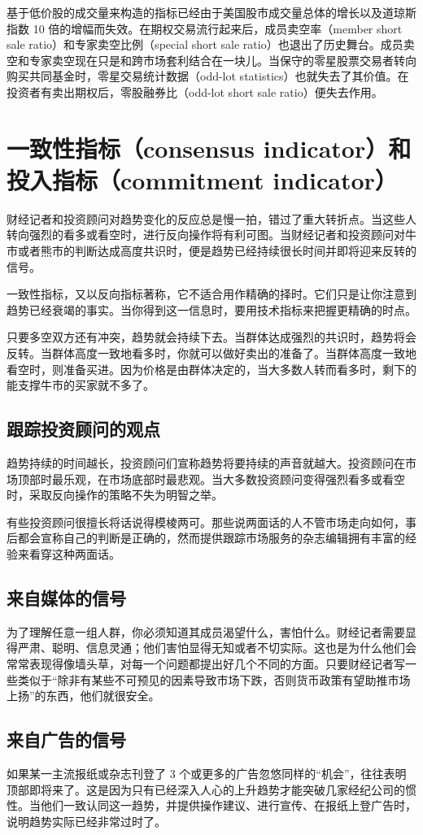 基于低价股的成交量来构造的指标已经由于美国股市成交量总体的增长以及道琼斯指数 10 倍的增幅而失效。在期权交易流行起来后，成员卖空率（member short sale ratio）和专家卖空比例（special short sale ratio）也退出了历史舞台。成员卖空和专家卖空现在只是和跨市场套利结合在一块儿。当保守的零星股票交易者转向购买共同基金时，零星交易统计数据（odd-lot statistics）也就失去了其价值。在投资者有卖出期权后，零股融券比（odd-lot short sale ratio）便失去作用。
\section{一致性指标（consensus indicator）和投入指标（commitment indicator）}
财经记者和投资顾问对趋势变化的反应总是慢一拍，错过了重大转折点。当这些人转向强烈的看多或看空时，进行反向操作将有利可图。当财经记者和投资顾问对牛市或者熊市的判断达成高度共识时，便是趋势已经持续很长时间并即将迎来反转的信号。

一致性指标，又以反向指标著称，它不适合用作精确的择时。它们只是让你注意到趋势已经衰竭的事实。当你得到这一信息时，要用技术指标来把握更精确的时点。

只要多空双方还有冲突，趋势就会持续下去。当群体达成强烈的共识时，趋势将会反转。当群体高度一致地看多时，你就可以做好卖出的准备了。当群体高度一致地看空时，则准备买进。因为价格是由群体决定的，当大多数人转而看多时，剩下的能支撑牛市的买家就不多了。
\subsection*{跟踪投资顾问的观点}
趋势持续的时间越长，投资顾问们宣称趋势将要持续的声音就越大。投资顾问在市场顶部时最乐观，在市场底部时最悲观。当大多数投资顾问变得强烈看多或看空时，采取反向操作的策略不失为明智之举。

有些投资顾问很擅长将话说得模棱两可。那些说两面话的人不管市场走向如何，事后都会宣称自己的判断是正确的，然而提供跟踪市场服务的杂志编辑拥有丰富的经验来看穿这种两面话。
\subsection*{来自媒体的信号}
为了理解任意一组人群，你必须知道其成员渴望什么，害怕什么。财经记者需要显得严肃、聪明、信息灵通；他们害怕显得无知或者不切实际。这也是为什么他们会常常表现得像墙头草，对每一个问题都提出好几个不同的方面。只要财经记者写一些类似于“除非有某些不可预见的因素导致市场下跌，否则货币政策有望助推市场上扬”的东西，他们就很安全。
\subsection*{来自广告的信号}
如果某一主流报纸或杂志刊登了 3 个或更多的广告忽悠同样的“机会”，往往表明顶部即将来了。这是因为只有已经深入人心的上升趋势才能突破几家经纪公司的惯性。当他们一致认同这一趋势，并提供操作建议、进行宣传、在报纸上登广告时，说明趋势实际已经非常过时了。

